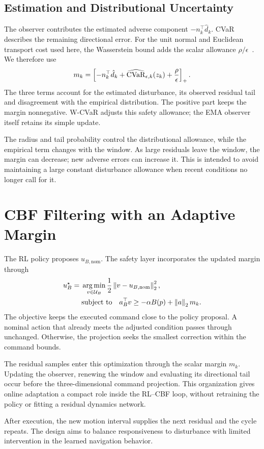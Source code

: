\FloatBarrier
\subsection{Estimation and Distributional Uncertainty}

The observer contributes the estimated adverse component $-n_k^\top\hat d_k$. CVaR describes the remaining directional error. For the unit normal and Euclidean transport cost used here, the Wasserstein bound adds the scalar allowance $\rho/\epsilon$~\cite{thEsfahani2018,long2024sensor}. We therefore use
\begin{equation}
 m_k=\left[
 -n_k^\top\hat d_k+
 \widehat{\operatorname{CVaR}}_{\epsilon,k}(z_k)+\frac{\rho}{\epsilon}
 \right]_+.
 \label{eq:contribution_margin}
\end{equation}
The three terms account for the estimated disturbance, its observed residual tail and disagreement with the empirical distribution. The positive part keeps the margin nonnegative. W-CVaR adjusts this safety allowance; the EMA observer itself retains its simple update.

The radius and tail probability control the distributional allowance, while the empirical term changes with the window. As large residuals leave the window, the margin can decrease; new adverse errors can increase it. This is intended to avoid maintaining a large constant disturbance allowance when recent conditions no longer call for it.

\section{CBF Filtering with an Adaptive Margin}

The RL policy proposes $u_{B,\mathrm{nom}}$. The safety layer incorporates the updated margin through
\begin{equation}
\begin{aligned}
 u_B^\star={}&\operatorname*{arg\,min}_{v\in\mathcal U_B}
              \frac12\left\lVert v-u_{B,\mathrm{nom}}\right\rVert_2^2,\\
 &\text{subject to}\quad
 a_B^\top v\geq-\alpha B(p)+\left\lVert a\right\rVert_2m_k.
\end{aligned}
\label{eq:contribution_projection}
\end{equation}
The objective keeps the executed command close to the policy proposal. A nominal action that already meets the adjusted condition passes through unchanged. Otherwise, the projection seeks the smallest correction within the command bounds.

The residual samples enter this optimization through the scalar margin $m_k$. Updating the observer, renewing the window and evaluating its directional tail occur before the three-dimensional command projection. This organization gives online adaptation a compact role inside the RL--CBF loop, without retraining the policy or fitting a residual dynamics network.

After execution, the new motion interval supplies the next residual and the cycle repeats. The design aims to balance responsiveness to disturbance with limited intervention in the learned navigation behavior.
